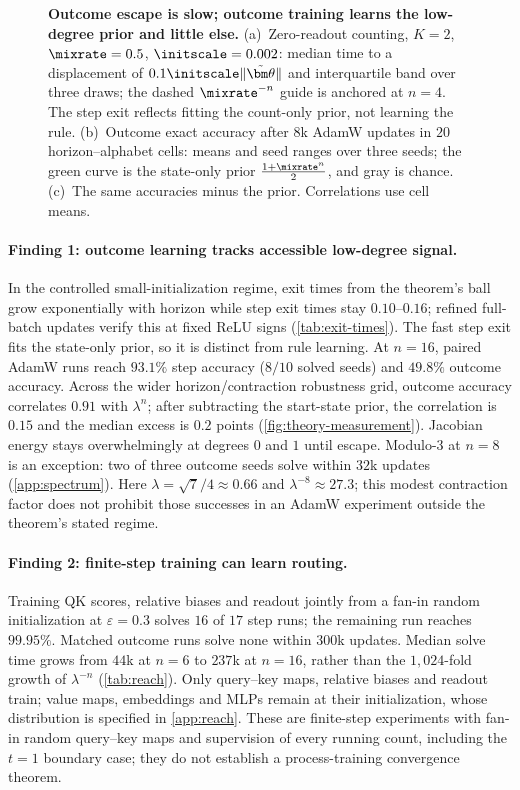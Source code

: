 \begin{figure}[t]
\centering
\resizebox{\linewidth}{!}{}
\caption{\textbf{Outcome escape is slow; outcome training learns the low-degree prior and little else.}
(a)~Zero-readout counting, $K=2$, $\mixrate=0.5$, $\initscale=0.002$: median time to a displacement of $0.1\initscale\|\tilde{\bm\theta}\|$ and interquartile band over three draws; the dashed $\mixrate^{-n}$ guide is anchored at $n=4$. The step exit reflects fitting the count-only prior, not learning the rule.
(b)~Outcome exact accuracy after $8$k AdamW updates in $20$ horizon--alphabet cells: means and seed ranges over three seeds; the green curve is the state-only prior $\frac{1+\mixrate^n}{2}$, and gray is chance.
(c)~The same accuracies minus the prior. Correlations use cell means.}
\label{fig:theory-measurement}
\label{fig:lambda-grid}
\end{figure}

\paragraph{Finding 1: outcome learning tracks accessible low-degree signal.}
In the controlled small-initialization regime, exit times from the theorem's ball grow
exponentially with horizon while step exit times stay $0.10$--$0.16$; refined full-batch
updates verify this at fixed ReLU signs (\cref{tab:exit-times}). The fast step exit fits
the state-only prior, so it is distinct from rule learning. At $n=16$, paired AdamW runs
reach $93.1\%$ step accuracy ($8/10$ solved seeds) and $49.8\%$ outcome accuracy.
Across the wider horizon/contraction robustness grid, outcome accuracy correlates $0.91$ with $\lambda^n$;
after subtracting the start-state prior, the correlation is $0.15$ and the median excess
is $0.2$ points (\cref{fig:theory-measurement}). Jacobian energy stays overwhelmingly at
degrees $0$ and $1$ until escape. Modulo-$3$ at $n=8$ is an exception: two of three
outcome seeds solve within $32$k updates (\cref{app:spectrum}). Here
$\lambda=\sqrt7/4\approx0.66$ and $\lambda^{-8}\approx27.3$; this modest contraction
factor does not prohibit those successes in an AdamW experiment outside the theorem's stated regime.

\paragraph{Finding 2: finite-step training can learn routing.}
Training QK scores, relative biases and readout jointly from a fan-in random initialization
at $\varepsilon=0.3$ solves $16$ of $17$ step runs; the remaining run reaches $99.95\%$.
Matched outcome runs solve none within $300$k updates. Median solve time grows from
$44$k at $n=6$ to $237$k at $n=16$, rather than the $1{,}024$-fold growth of $\lambda^{-n}$
(\cref{tab:reach}). Only query--key maps, relative biases and readout train;
value maps, embeddings and MLPs remain at their initialization, whose distribution is specified
in \cref{app:reach}. These are finite-step experiments with fan-in random query--key
maps and supervision of every running count, including the $t=1$ boundary case;
they do not establish a process-training convergence theorem.

